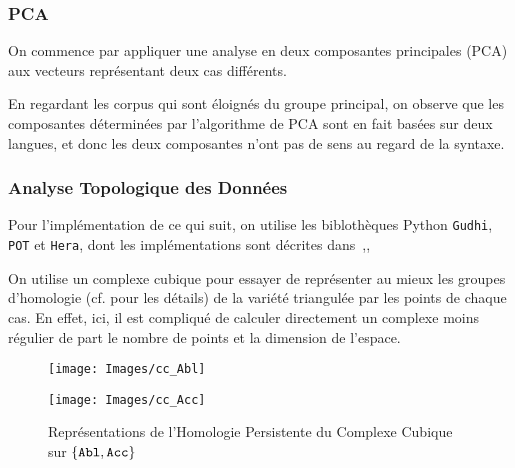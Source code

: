 \documentclass{article}
\begin{document}
\subsubsection{PCA}\label{subsub:pca}
On commence par appliquer une analyse en deux composantes principales (PCA) aux vecteurs représentant deux cas différents.


En regardant les corpus qui sont éloignés du groupe principal, on observe que les composantes déterminées par l'algorithme de PCA sont en fait basées sur deux langues, et donc les deux composantes n'ont pas de sens au regard de la syntaxe.

\subsubsection{Analyse Topologique des Données}\label{subsub:tda}
Pour l'implémentation de ce qui suit, on utilise les biblothèques Python \texttt{Gudhi}, \texttt{POT} et \texttt{Hera}, dont les implémentations sont décrites dans~\cite{Gudhi},\cite{PythonPOT},~\cite{Hera}

On utilise un complexe cubique pour essayer de représenter au mieux les groupes d'homologie (cf. \cite{tldrtda} pour les détails) de la variété triangulée par les points de chaque cas. En effet, ici, il est compliqué de calculer directement un complexe moins régulier de part le nombre de points et la dimension de l'espace.

\begin{figure}[h]
\begin{minipage}{.5\textwidth}
        \begin{center}
        \texttt{[image: Images/cc\_Abl]}
        \end{center}
\end{minipage}
\begin{minipage}{.5\textwidth}
        \begin{center}
        \texttt{[image: Images/cc\_Acc]}
        \end{center}
\end{minipage}
\caption{Représentations de l'Homologie Persistente du Complexe Cubique sur $\{\tt Abl,Acc\}$}
\end{figure}
\end{document}
